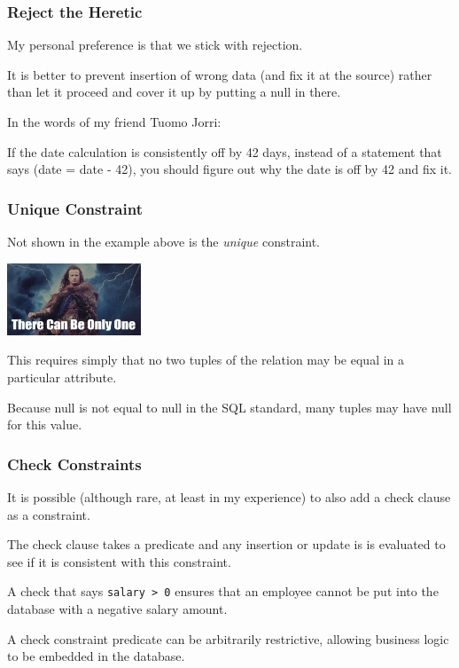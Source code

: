 \begin{frame}
\frametitle{Reject the Heretic}

My personal preference is that we stick with rejection.

It is better to prevent insertion of wrong data (and fix it at the source) rather than let it proceed and cover it up by putting a null in there. 

In the words of my friend Tuomo Jorri: 

If the date calculation is consistently off by 42 days, instead of a statement that says (date = date - 42), you should figure out why the date is off by 42 and fix it.

\end{frame}


\begin{frame}
\frametitle{Unique Constraint}

Not shown in the example above is the \textit{unique} constraint. 

\begin{center}
	\includegraphics[width=0.3\textwidth]{images/only-one.jpg}
\end{center}

This requires simply that no two tuples of the relation may be equal in a particular attribute. 

Because null is not equal to null in the SQL standard, many tuples may have null for this value.

\end{frame}

\begin{frame}
\frametitle{Check Constraints}

It is possible (although rare, at least in my experience) to also add a \alert{check} clause as a constraint. 

The check clause takes a predicate and any insertion or update is is evaluated to see if it is consistent with this constraint. 

A check that says \texttt{salary > 0} ensures that an employee cannot be put into the database with a negative salary amount. 

A check constraint predicate can be arbitrarily restrictive, allowing business logic to be embedded in the database.

\end{frame}


